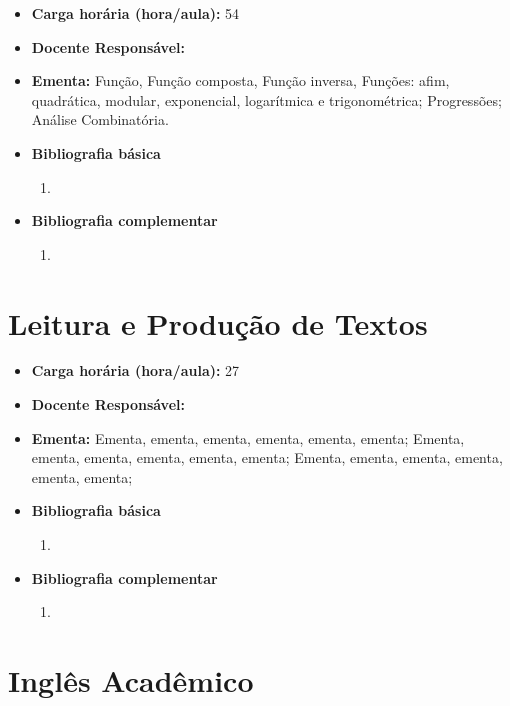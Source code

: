 \documentclass[11pt,fleqn]{book} %
\begin{document}
\begin{itemize}
	\item \textbf{Carga horária (hora/aula):} 54
	\item \textbf{Docente Responsável:}~
	\item \textbf{Ementa:} 
	Função, Função composta, Função inversa, Funções: afim, quadrática, modular, exponencial, logarítmica e trigonométrica;
	Progressões;
	Análise Combinatória.
	\item \textbf{Bibliografia básica}
	\begin{enumerate}
		\item 
	\end{enumerate}
	\item \textbf{Bibliografia complementar}
	\begin{enumerate}
		\item 
	\end{enumerate}	
\end{itemize}


\newpage
\section{Leitura e Produção de Textos}\label{disc:leitprodtextos}

\begin{itemize}
	\item \textbf{Carga horária (hora/aula):} 27
	\item \textbf{Docente Responsável:}~
	\item \textbf{Ementa:} 
	Ementa, ementa, ementa, ementa, ementa, ementa;
	Ementa, ementa, ementa, ementa, ementa, ementa;
	Ementa, ementa, ementa, ementa, ementa, ementa;
	\item \textbf{Bibliografia básica}
	\begin{enumerate}
		\item 
	\end{enumerate}
	\item \textbf{Bibliografia complementar}
	\begin{enumerate}
		\item 
	\end{enumerate}	
\end{itemize}


\newpage
\section{Inglês Acadêmico}\label{disc:inglacad}
\end{document}
